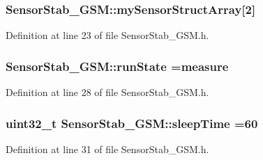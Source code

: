 \subsubsection[{\texorpdfstring{my\+Sensor\+Struct\+Array}{mySensorStructArray}}]{ Sensor\+Stab\+\_\+\+G\+S\+M\+::my\+Sensor\+Struct\+Array\mbox{[}2\mbox{]}}\hypertarget{class_sensor_stab___g_s_m_a48dc071e4660abfbeb553e9fc0568529}{}\label{class_sensor_stab___g_s_m_a48dc071e4660abfbeb553e9fc0568529}


Definition at line 23 of file Sensor\+Stab\+\_\+\+G\+S\+M.\+h.

\subsubsection[{\texorpdfstring{run\+State}{runState}}]{ Sensor\+Stab\+\_\+\+G\+S\+M\+::run\+State ={\bf measure}\hspace{0.3cm}{\ttfamily [private]}}\hypertarget{class_sensor_stab___g_s_m_a413ed86e48c8640f40304d0230a034b0}{}\label{class_sensor_stab___g_s_m_a413ed86e48c8640f40304d0230a034b0}


Definition at line 28 of file Sensor\+Stab\+\_\+\+G\+S\+M.\+h.

\subsubsection[{\texorpdfstring{sleep\+Time}{sleepTime}}]{\setlength{\rightskip}{0pt plus 5cm}uint32\+\_\+t Sensor\+Stab\+\_\+\+G\+S\+M\+::sleep\+Time =60\hspace{0.3cm}{\ttfamily [private]}}\hypertarget{class_sensor_stab___g_s_m_a2d2198862b030d374a21bfd9fc64807f}{}\label{class_sensor_stab___g_s_m_a2d2198862b030d374a21bfd9fc64807f}


Definition at line 31 of file Sensor\+Stab\+\_\+\+G\+S\+M.\+h.

